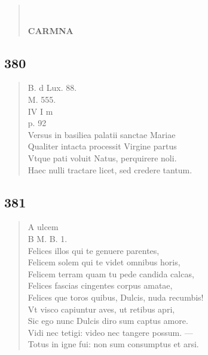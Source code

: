 \documentclass[11pt, a4paper]{report}
\begin{document}
\begin{verse}
        ﻿\pagebreak 
     \marginpar{[000]} \begin{center} \textbf{CARMNA} \end{center}
      \end{verse}
  
            \subsection*{380}
      \begin{verse}
      B. d Lux. 88. \\ M. 555. \\ IV I m \\ p. 92 \\ Versus in basiliea palatii sanctae Mariae \\ Qualiter intacta processit Virgine partus \\ Vtque pati voluit Natus, perquirere noli. \\ Haec nulli tractare licet, sed credere tantum. \\ 
      \end{verse}
  
            \subsection*{381}
      \begin{verse}
       \lbrack A ulcem \rbrack  \\ B M. B. 1. \\ Felices illos qui te genuere parentes, \\ Felicem solem qui te videt omnibus horis, \\ Felicem terram quam tu pede candida calcas, \\ Felices fascias cingentes corpus amatae, \\ Felices \lbrack que \rbrack  toros quibus, Dulcis, nuda recumbis! \\ Vt visco capiuntur aves, ut retibus apri, \\ Sic ego nunc Dulcis diro sum captus amore. \\ Vidi nec tetigi: video nec tangere possum. — \\ Totus in igne fui: non sum consumptus et arsi. \\ 
      \end{verse}
  
\end{document}
